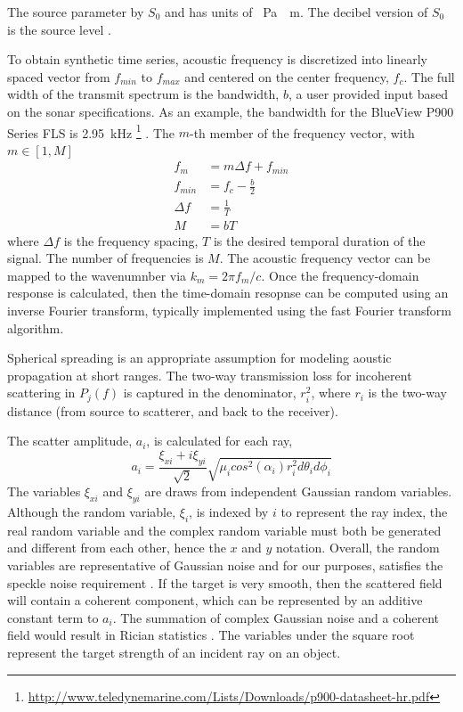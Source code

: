 \documentclass[utf8]{frontiersSCNS} %
\begin{document}
The source parameter by $S_0$ and has units of \SI{}{\pascal\cdot\meter}. The decibel version of $S_0$ is the source level \citep{urick13principles}.

To obtain synthetic time series, acoustic frequency is discretized into linearly spaced vector from $f_{min}$ to $f_{max}$ and centered on the center frequency, $f_c$. The full width of the transmit spectrum is the bandwidth, $b$, a user provided input based on the sonar specifications. As an example, the bandwidth for the BlueView P900 Series FLS is \SI{2.95}{\kHz} \footnote{\url{http://www.teledynemarine.com/Lists/Downloads/p900-datasheet-hr.pdf}} \citep{blueviewp900}. The $m$-th member of the frequency vector, with $m \in [1,M]$
\begin{align}
    f_m&=m\Delta f +f_{min} \\
    f_{min} &= f_c - \frac{b}{2}\\
    \Delta f &= \frac{1}{T} \\
    M &= bT
\end{align}
where $\Delta f$ is the frequency spacing, $T$ is the desired temporal duration of the signal. The number of frequencies is $M$. The acoustic frequency vector can be mapped to the wavenumnber via $k_m = 2\pi f_m/c$. Once the frequency-domain response is calculated, then the time-domain resopnse can be computed using an inverse Fourier transform, typically implemented using the fast Fourier transform algorithm.

Spherical spreading is an appropriate assumption for modeling aoustic propagation at short ranges. The two-way transmission loss for incoherent scattering in $P_j(f)$ is captured in the denominator, $r_i^2$, where $r_i$ is the two-way distance (from source to scatterer, and back to the receiver).

The scatter amplitude, $a_i$, is calculated for each ray,
\begin{equation}
    a_i = \frac{\xi_{xi} + i \xi_{yi}}{\sqrt{2}}\sqrt{\mu_i cos^2(\alpha_i)r_i^2d\theta_id\phi_i}
\end{equation}
The variables $\xi_{xi}$ and $\xi_{yi}$ are draws from independent Gaussian random variables. Although the random variable, $\xi_i$, is indexed by $i$ to represent the ray index, the real random variable and the complex random variable must both be generated and different from each other, hence the $x$ and $y$ notation. Overall, the random variables are representative of Gaussian noise and for our purposes, satisfies the speckle noise requirement \citep{brown17point}. If the target is very smooth, then the scattered field will contain a coherent component, which can be represented by an additive constant term to $a_i$. The summation of complex Gaussian noise and a coherent field would result in Rician statistics \cite{rice_1944}. The variables under the square root represent the target strength of an incident ray on an object.
\end{document}
